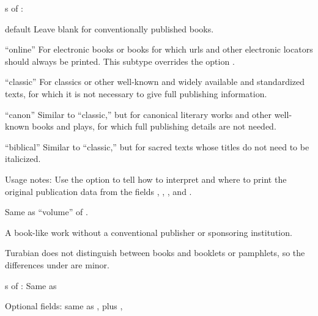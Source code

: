 \documentclass{ltxdockit}[2010/02/12]
\begin{document}
\begin{typelist}
s of :
\begin{valuelist}
\item[default] Leave   blank for conventionally published books.
\item[``online''] For electronic books or books for which urls and other electronic locators should always be printed. This subtype overrides the option .
\item[``classic''] For classics or other well-known and widely available and standardized texts, for which it is not necessary to give full publishing information.
\item[``canon''] Similar to ``classic,'' but for canonical literary works and other well-known books and plays, for which full publishing details are not needed.
\item[``biblical''] Similar to ``classic,'' but for sacred texts whose titles do not need to be italicized.
\end{valuelist}


Usage notes: Use the  option to tell  how to interpret and where to print the original publication data from the fields , , , and . 

	

 Same as  ``volume'' of .

	


A book-like work without a conventional publisher or sponsoring institution.

Turabian does not distinguish between books and booklets or pamphlets, so the differences under are minor.

s of : Same as 
\item Optional fields: same as , plus , 


\end{typelist}
\end{document}
